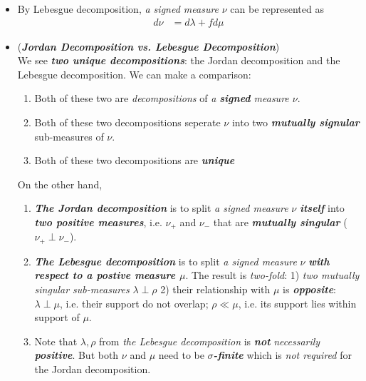 \documentclass[11pt]{article}
\begin{document}
\begin{itemize}
  \item \begin{remark} By Lebesgue decomposition, \emph{a signed measure} $\nu$ can be represented as
 \begin{align*}
 d\nu &= d\lambda + fd\mu 
 \end{align*}
 \end{remark}

\item \begin{remark} (\emph{\textbf{Jordan Decomposition vs. Lebesgue Decomposition}})\\
We see \emph{\textbf{two unique decompositions}}: the Jordan decomposition and the Lebesgue decomposition. We can make a comparison: 
\begin{enumerate}
\item Both of these two are \emph{decompositions} of \emph{a \textbf{signed} measure $\nu$}.
\item Both of these two decompositions seperate $\nu$ into two  \emph{\textbf{mutually signular}} sub-measures of $\nu$.
\item Both of these two decompositions are \emph{\textbf{unique}}
\end{enumerate}
On the other hand,
\begin{enumerate}
\item \emph{\textbf{The Jordan decomposition}} is to split \emph{a signed measure} $\nu$ \emph{\textbf{itself}} into \emph{\textbf{two positive measures}}, i.e. $\nu_{+}$ and $\nu_{-}$ that are \emph{\textbf{mutually singular}} ($\nu_{+} \perp \nu_{-}$). 

\item \emph{\textbf{The Lebesgue decomposition}} is to split \emph{a signed measure} $\nu$ \emph{\textbf{with respect to a postive measure $\mu$}}. The result is \emph{two-fold}: 1) \emph{two mutually singular sub-measures} $\lambda \perp \rho$ 2) their relationship with $\mu$ is \emph{\textbf{opposite}}:  $\lambda \perp \mu$, i.e. their support do not overlap; $\rho \ll \mu$, i.e. its support lies within support of $\mu$.

\item Note that $\lambda, \rho$ from \emph{the Lebesgue decomposition} is \emph{\textbf{not}} \emph{necessarily} \emph{\textbf{positive}}. But both $\nu$ and $\mu$ need to be \emph{\textbf{$\sigma$-finite}} which is \emph{not required} for the Jordan decomposition.
\end{enumerate}
\end{remark} 



\end{itemize}
\end{document}
